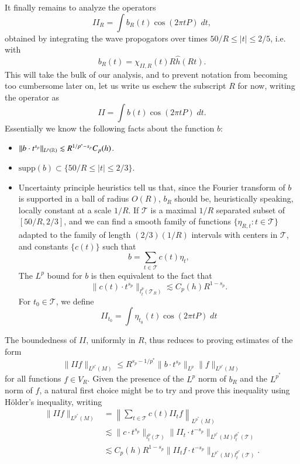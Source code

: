 It finally remains to analyze the operators
%
\[ II_R = \int b_R(t) \cos(2 \pi t P)\; dt, \]
%
obtained by integrating the wave propogators over times $50/R \leq |t| \leq 2/5$, i.e. with
%
\[ b_R(t) = \chi_{II,R}(t) R \widehat{h}(Rt). \]
%
This will take the bulk of our analysis, and to prevent notation from becoming too cumbersome later on, let us write us eschew the subscript $R$ for now, writing the operator as
%
\[ II = \int b(t) \cos(2 \pi t P)\; dt. \]
%
Essentially we know the following facts about the function $b$:
%
\begin{itemize}
    \item $\| b \cdot t^{s_p} \|_{L^p(\operatorname{\mathbb{R}})} \lesssim R^{1/p^* - s_p} C_p(h)$.

    \item $\text{supp}(b) \subset \{ 50/R \leq |t| \leq 2/3 \}$.

    \item Uncertainty principle heuristics tell us that, since the Fourier transform of $b$ is supported in a ball of radius $O(R)$, $b_R$ should be, heuristically speaking, locally constant at a scale $1/R$. If $\mathcal{T}$ is a maximal $1/R$ separated subset of $[50/R, 2/3]$, and we can find a smooth family of functions $\{ \eta_{R,t} : t \in \mathcal{T} \}$ adapted to the family of length $(2/3)(1/R)$ intervals with centers in $\mathcal{T}$, and constants $\{ c(t) \}$ such that
    \[ b = \sum_{t \in \mathcal{T}} c(t) \eta_t, \]
    The $L^p$ bound for $b$ is then equivalent to the fact that
    \[ \| c(t) \cdot t^{s_p} \|_{l^p_t(\mathcal{T}_R)} \lesssim C_p(h) R^{1 - s_p}. \]
    For $t_0 \in \mathcal{T}$, we define
    \[ II_{t_0} = \int \eta_{t_0}(t) \cos(2 \pi t P)\; dt \]
\end{itemize}
%
The boundedness of $II$, uniformly in $R$, thus reduces to proving estimates of the form
%
\[ \| II f \|_{L^{p^*}(M)} \leq R^{s_p - 1/p^*} \| b \cdot t^{s_p} \|_{L^p} \| f \|_{L^{p^*}(M)} \]
%
for all functions $f \in V_R$. Given the presence of the $L^p$ norm of $b_R$ and the $L^{p^*}$ norm of $f$, a natural first choice might be to try and prove this inequality using H\"{o}lder's inequality, writing
\begin{align*}
    \| II f \|_{L^{p^*}(M)} &= \left\| \sum_{t \in \mathcal{T}} c(t) II_t f \right\|_{L^{p^*}(M)}\\
    &\lesssim \| c \cdot t^{s_p} \|_{l^p_t(\mathcal{T})} \| II_t \cdot t^{- s_p} \|_{L^{p^*}(M) l^{p^*}_t(\mathcal{T})}\\
    &\lesssim C_p(h) R^{1 - s_p} \| II_t f \cdot t^{-s_p} \|_{L^{p^*}(M) l^{p^*}_t(\mathcal{T})}.
\end{align*}
